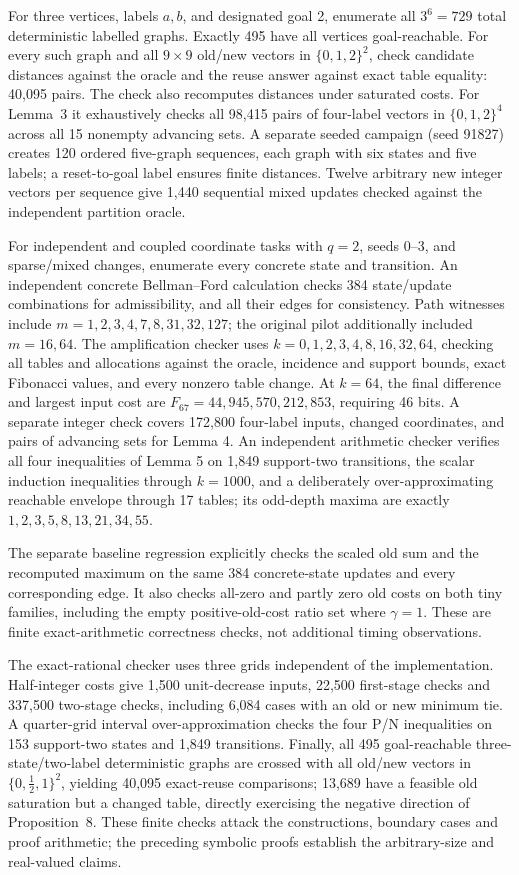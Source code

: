 For three vertices, labels $a,b$, and designated goal 2, enumerate all $3^6=729$ total deterministic labelled graphs. Exactly 495 have all vertices goal-reachable. For every such graph and all $9\times9$ old/new vectors in $\{0,1,2\}^2$, check candidate distances against the oracle and the reuse answer against exact table equality: 40,095 pairs. The check also recomputes distances under saturated costs. For Lemma~3 it exhaustively checks all 98,415 pairs of four-label vectors in $\{0,1,2\}^4$ across all 15 nonempty advancing sets. A separate seeded campaign (seed 91827) creates 120 ordered five-graph sequences, each graph with six states and five labels; a reset-to-goal label ensures finite distances. Twelve arbitrary new integer vectors per sequence give 1,440 sequential mixed updates checked against the independent partition oracle.

For independent and coupled coordinate tasks with $q=2$, seeds 0--3, and sparse/mixed changes, enumerate every concrete state and transition. An independent concrete Bellman--Ford calculation checks 384 state/update combinations for admissibility, and all their edges for consistency. Path witnesses include $m=1,2,3,4,7,8,31,32,127$; the original pilot additionally included $m=16,64$. The amplification checker uses $k=0,1,2,3,4,8,16,32,64$, checking all tables and allocations against the oracle, incidence and support bounds, exact Fibonacci values, and every nonzero table change. At $k=64$, the final difference and largest input cost are $F_{67}=44{,}945{,}570{,}212{,}853$, requiring 46 bits. A separate integer check covers 172,800 four-label inputs, changed coordinates, and pairs of advancing sets for Lemma 4. An independent arithmetic checker verifies all four inequalities of Lemma 5 on 1,849 support-two transitions, the scalar induction inequalities through $k=1000$, and a deliberately over-approximating reachable envelope through 17 tables; its odd-depth maxima are exactly $1,2,3,5,8,13,21,34,55$.

The separate baseline regression explicitly checks the scaled old sum and the recomputed maximum on the same 384 concrete-state updates and every corresponding edge. It also checks all-zero and partly zero old costs on both tiny families, including the empty positive-old-cost ratio set where $\gamma=1$. These are finite exact-arithmetic correctness checks, not additional timing observations.

The exact-rational checker uses three grids independent of the implementation. Half-integer costs give 1,500 unit-decrease inputs, 22,500 first-stage checks and 337,500 two-stage checks, including 6,084 cases with an old or new minimum tie. A quarter-grid interval over-approximation checks the four P/N inequalities on 153 support-two states and 1,849 transitions. Finally, all 495 goal-reachable three-state/two-label deterministic graphs are crossed with all old/new vectors in $\{0,\tfrac12,1\}^2$, yielding 40,095 exact-reuse comparisons; 13,689 have a feasible old saturation but a changed table, directly exercising the negative direction of Proposition~8. These finite checks attack the constructions, boundary cases and proof arithmetic; the preceding symbolic proofs establish the arbitrary-size and real-valued claims.

